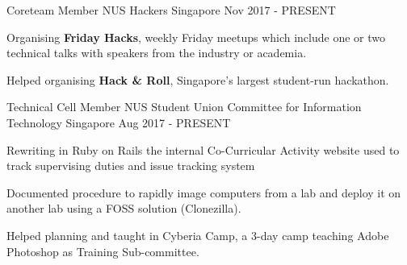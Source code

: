 

\begin{cventries}

 \cventry
    {Coreteam Member} %
    {NUS Hackers} %
    {Singapore} %
    {Nov 2017 - PRESENT} %
    {
      \begin{cvitems} %
      	\item {Organising \textbf{Friday Hacks}, weekly Friday meetups which include one or two technical talks with speakers from the industry or academia.}
      	\item {Helped organising \textbf{Hack \& Roll}, Singapore's largest student-run hackathon.}
      \end{cvitems}
    }
    
  \cventry
    {Technical Cell Member} %
    {NUS Student Union Committee for Information Technology} %
    {Singapore} %
    {Aug 2017 - PRESENT} %
    {
      \begin{cvitems} %
	    \item {Rewriting in Ruby on Rails the internal Co-Curricular Activity website used to track supervising duties and issue tracking system}
      	\item {Documented procedure to rapidly image computers from a lab and deploy it on another lab using a FOSS solution (Clonezilla).}
        \item {Helped planning and taught in Cyberia Camp, a 3-day camp teaching Adobe Photoshop as Training Sub-committee.}
      \end{cvitems}
    }
    
\end{cventries}
